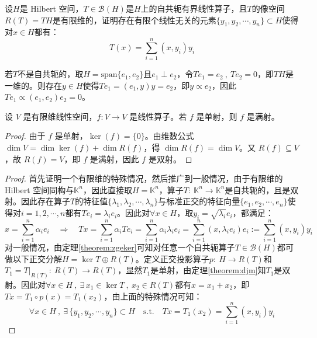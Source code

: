 \begin{example}
\quad 设$H$是 Hilbert 空间，$T\in\mathscr{B}(H)$是$H$上的自共轭有界线性算子，且$T$的像空间$R(T)=TH$是有限维的，证明存在有限个线性无关的元素$\{y_1,y_2,\cdots,y_n\} \subset H$使得对$x \in H$都有：
\[T(x)=\sum_{i=1}^n(x,y_i)y_i\]
\end{example}
\begin{remark}
\quad 若$T$不是自共轭的，取$H=\text{span}\{e_1,e_2\}$且$e_1 \perp e_2$，令$Te_1=e_2 \ , \ Te_2=0$，即$TH$是一维的。则存在$y \in H$使得$Te_1=(e_1,y)y=e_2$，即$y \propto e_2$，因此$Te_1\propto (e_1,e_2)e_2=0$。
\end{remark}
\begin{theorem}\label{theorem:djm}
设 $V$ 是有限维线性空间，$f: V \to V$ 是线性算子。若 $f$ 是单射，则 $f$ 是满射。
\end{theorem}
\begin{proof}
由于 $f$ 是单射，$\ker(f) = \{0\}$。由维数公式$\dim V = \dim \ker(f) + \dim R(f)$，得 $\dim R(f) = \dim V$。又 $R(f) \subseteq V$，故 $R(f) = V$，即 $f$ 是满射，因此 $f$ 是双射。
\end{proof}
\begin{proof}
首先证明一个有限维的特殊情况，然后推广到一般情况，由于有限维的 Hilbert 空间同构与$\mathbb{K}^n$，因此直接取$H=\mathbb{K}^n$，算子$T: \ \mathbb{K}^n \to \mathbb{K}^n$是自共轭的，且是双射。因此存在算子$T$的特征值$\{\lambda_1,\lambda_2,\cdots,\lambda_n\}$与标准正交的特征向量$\{e_1,e_2,\cdots,e_n\}$使得对$i=1,2,\cdots,n$都有$Te_i=\lambda_ie_i$。因此对$\forall x \in H$，取$y_i=\sqrt{\lambda_i}e_i$，都满足：
\[x=\sum_{i=1}^n\alpha_ie_i \quad \Rightarrow \quad Tx=\sum_{i=1}^n\alpha_iTe_i=\sum_{i=1}^n\alpha_i\lambda_ie_i=\sum_{i=1}^n(x,\lambda_ie_i)e_i:=\sum_{i=1}^n(x,y_i)y_i\]
对一般情况，由定理\ref{theorem:zgeker}可知对任意一个自共轭算子$T\in\mathscr{B}(H)$都可做以下正交分解$H=\ker T \oplus R(T)$。定义正交投影算子$p: \ H \to R(T)$和$T_1=T|_{R(T)}: \ R(T) \to R(T)$，显然$T_1$是单射，由定理\ref{theorem:djm}知$T_1$是双射。因此对$\forall x \in H \ , \ \exists \, x_1 \in \ker T \ , \ x_2 \in R(T)$都有$x=x_1+x_2$，即$Tx=T_1 \circ p(x)=T_1(x_2)$，由上面的特殊情况可知：
\[\forall x \in H \ , \ \exists \, \{y_1,y_2,\cdots,y_n\} \subset H \quad \text{s.t.} \quad Tx=T_1(x_2)=\sum_{i=1}^n(x,y_i)y_i\]
\end{proof}

